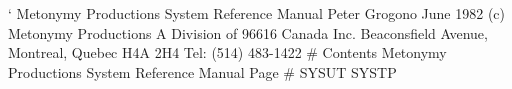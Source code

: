 `
\ce Metonymy Productions
\ce System Reference Manual
\ce Peter Grogono
\ce June 1982
\ce (c) Metonymy Productions
\ce A Division of 96616 Canada Inc.
 Beaconsfield Avenue, Montreal, Quebec H4A 2H4  Tel: (514) 483-1422
\ep
{}
\tc # Contents
\fl Metonymy Productions             System Reference Manual            Page #
\ic SYSUT
\ic SYSTP
